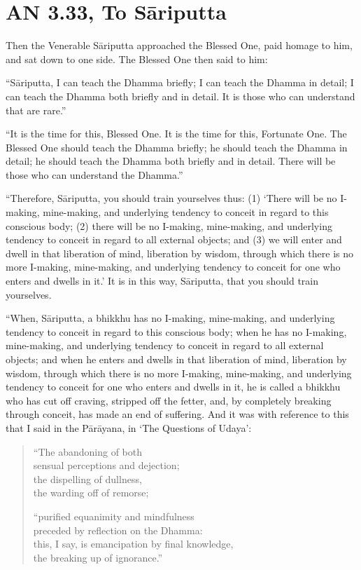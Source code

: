 \chapter{AN 3.33, To Sāriputta}

Then the Venerable Sāriputta approached the Blessed One, paid homage to him, and sat down to one side. The Blessed One then said to him:

``Sāriputta, I can teach the Dhamma briefly; I can teach the Dhamma in detail; I can teach the Dhamma both briefly and in detail. It is those who can understand that are rare.''

``It is the time for this, Blessed One. It is the time for this, Fortunate One. The Blessed One should teach the Dhamma briefly; he should teach the Dhamma in detail; he should teach the Dhamma both briefly and in detail. There will be those who can understand the Dhamma.''

``Therefore, Sāriputta, you should train yourselves thus: (1) `There will be no I-making, mine-making, and underlying tendency to conceit in regard to this conscious body; (2) there will be no I-making, mine-making, and underlying tendency to conceit in regard to all external objects; and (3) we will enter and dwell in that liberation of mind, liberation by wisdom, through which there is no more I-making, mine-making, and underlying tendency to conceit for one who enters and dwells in it.' It is in this way, Sāriputta, that you should train yourselves.

``When, Sāriputta, a bhikkhu has no I-making, mine-making, and underlying tendency to conceit in regard to this conscious body; when he has no I-making, mine-making, and underlying tendency to conceit in regard to all external objects; and when he enters and dwells in that liberation of mind, liberation by wisdom, through which there is no more I-making, mine-making, and underlying tendency to conceit for one who enters and dwells in it, he is called a bhikkhu who has cut off craving, stripped off the fetter, and, by completely breaking through conceit, has made an end of suffering. And it was with reference to this that I said in the Pārāyana, in `The Questions of Udaya':

\begin{quote}
``The abandoning of both\\
sensual perceptions and dejection;\\
the dispelling of dullness,\\
the warding off of remorse;

``purified equanimity and mindfulness\\
preceded by reflection on the Dhamma:\\
this, I say, is emancipation by final knowledge,\\
the breaking up of ignorance.''
\end{quote}

